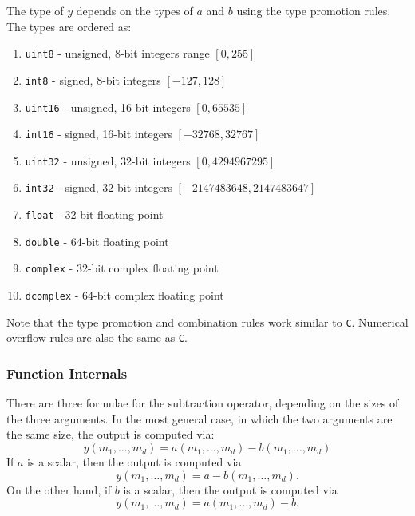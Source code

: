 The type of $y$ depends on the types of $a$ and $b$ using the type 
promotion rules.  The types are ordered as:
\begin{enumerate}
\item \verb|uint8| - unsigned, 8-bit integers range $[0,255]$
\item \verb|int8| - signed, 8-bit integers $[-127,128]$
\item \verb|uint16| - unsigned, 16-bit integers $[0,65535]$
\item \verb|int16| - signed, 16-bit integers $[-32768,32767]$
\item \verb|uint32| - unsigned, 32-bit integers $[0,4294967295]$
\item \verb|int32| - signed, 32-bit integers $[-2147483648,2147483647]$
\item \verb|float| - 32-bit floating point
\item \verb|double| - 64-bit floating point
\item \verb|complex| - 32-bit complex floating point
\item \verb|dcomplex| - 64-bit complex floating point
\end{enumerate}
Note that the type promotion and combination rules work similar to 
\verb|C|.  Numerical overflow rules are also the same as \verb|C|.
\subsubsection{Function Internals}
There are three formulae for the subtraction operator, depending on the
sizes of the three arguments.  In the most general case, in which 
the two arguments are the same size, the output is computed via:
\[
y(m_1,\ldots,m_d) = a(m_1,\ldots,m_d) - b(m_1,\ldots,m_d)
\]
If $a$ is a scalar, then the output is computed via
\[
y(m_1,\ldots,m_d) = a - b(m_1,\ldots,m_d).
\]
On the other hand, if $b$ is a scalar, then the output is computed via
\[
y(m_1,\ldots,m_d) = a(m_1,\ldots,m_d) - b.
\]
